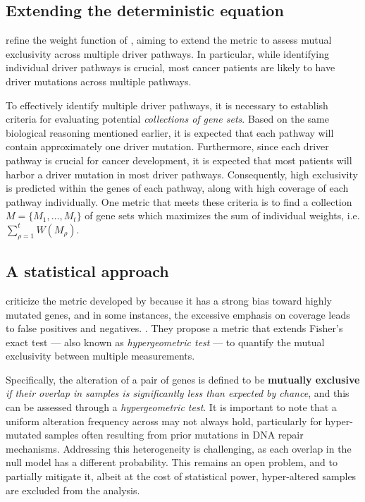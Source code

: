 \subsection{Extending the deterministic equation} \label{multi_dendrix_2nd_chap} 

\textcite{multi-dendrix} refine the weight function of \textcite{dendrix}, aiming to extend the metric to assess mutual exclusivity across multiple driver pathways. In particular, while identifying individual driver pathways is crucial, most cancer patients are likely to have driver mutations across multiple pathways.

To effectively identify multiple driver pathways, it is necessary to establish criteria for evaluating potential \textit{collections of gene sets}. Based on the same biological reasoning mentioned earlier, it is expected that each pathway will contain approximately one driver mutation. Furthermore, since each driver pathway is crucial for cancer development, it is expected that most patients will harbor a driver mutation in most driver pathways. Consequently, high exclusivity is predicted within the genes of each pathway, along with high coverage of each pathway individually. One metric that meets these criteria is to find a collection $M = \{M_1, \ldots, M_t\}$ of gene sets which maximizes the sum of individual weights, i.e. $\sum_{\rho = 1}^t {W(M_\rho)}$.

\subsection{A statistical approach}

\textcite{mutex} criticize the metric developed by \textcite{dendrix} because it has a strong bias toward highly mutated genes, and in some instances, the excessive emphasis on coverage leads to false positives and negatives. . They propose a metric that extends Fisher's exact test --- also known as \textit{hypergeometric test} --- to quantify the mutual exclusivity between multiple measurements.

Specifically, the alteration of a pair of genes is defined to be \textbf{mutually exclusive} \textit{if their overlap in samples is significantly less than expected by chance}, and this can be assessed through a \textit{hypergeometric test}. It is important to note that a uniform alteration frequency across may not always hold, particularly for hyper-mutated samples often resulting from prior mutations in DNA repair mechanisms. Addressing this heterogeneity is challenging, as each overlap in the null model has a different probability. This remains an open problem, and to partially mitigate it, albeit at the cost of statistical power, hyper-altered samples are excluded from the analysis.

